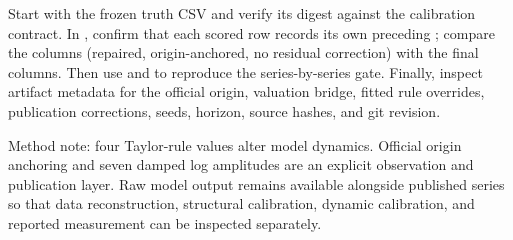 \documentclass[10pt]{article}
\begin{document}
Start with the frozen truth CSV and verify its digest against the calibration
contract. In , confirm that each scored row records
its own preceding ; compare the
 columns (repaired, origin-anchored, no residual correction)
with the final  columns. Then use
 and  to reproduce the
series-by-series gate. Finally, inspect artifact metadata for the official
origin, valuation bridge, fitted rule overrides, publication corrections,
seeds, horizon, source hashes, and git revision.

{\small\color{slate}
Method note: four Taylor-rule values alter model dynamics. Official origin
anchoring and seven damped log amplitudes are an explicit observation and
publication layer. Raw model output remains available alongside published
series so that data reconstruction, structural calibration, dynamic
calibration, and reported measurement can be inspected separately.}
\end{document}
